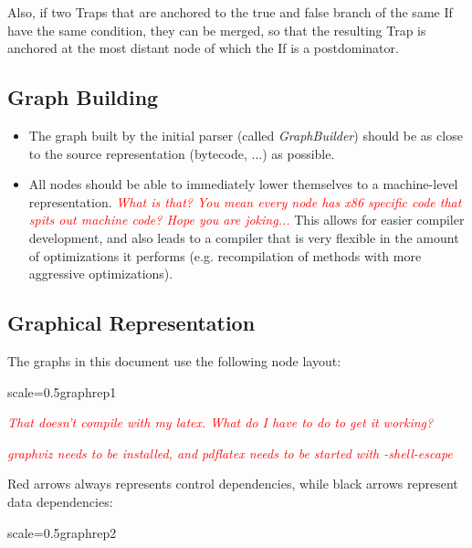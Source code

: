 \documentclass[twocolumn]{svjour3}
\newcommand{\mynote}[2]{
\textcolor{red}{\fbox{\bfseries\sffamily\scriptsize#1}
  {\small\textsf{\emph{#2}}}
\fbox{\bfseries\sffamily\scriptsize }}}
\newcommand\cw[1]{\mynote{CW}{#1}}
\newcommand\ls[1]{\mynote{LS}{#1}}
\begin{document}
Also, if two Traps that are anchored to the true and false branch of the same If have the same condition, they can be merged, so that the resulting Trap is anchored at the most distant node of which the If is a postdominator.


\subsection{Graph Building}
\begin{itemize}
    \item The graph built by the initial parser (called \emph{GraphBuilder}) should be as close to the source representation (bytecode, ...) as possible.
    \item All nodes should be able to immediately lower themselves to a machine-level representation. \cw{What is that?  You mean every node has x86 specific code that spits out machine code?  Hope you are joking...} This allows for easier compiler development, and also leads to a compiler that is very flexible in the amount of optimizations it performs (e.g. recompilation of methods with more aggressive optimizations).
\end{itemize}

\subsection{Graphical Representation}
The graphs in this document use the following node layout:

\begin{digraphenv}{scale=0.5}{graphrep1}
\end{digraphenv}

\cw{That doesn't compile with my latex.  What do I have to do to get it working?}
\ls{graphviz needs to be installed, and pdflatex needs to be started with -shell-escape}

Red arrows always represents control dependencies, while black arrows represent data dependencies:

\begin{digraphenv}{scale=0.5}{graphrep2}
\end{digraphenv}
\end{document}
